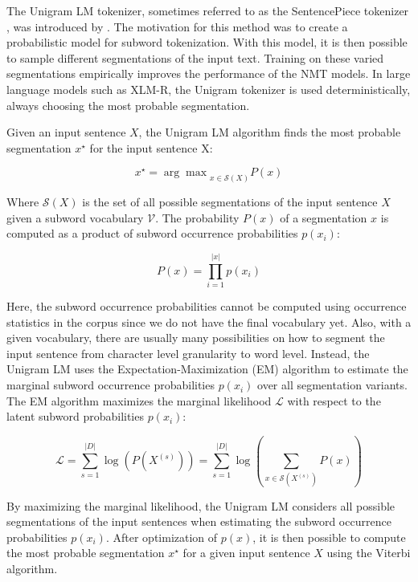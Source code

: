 The Unigram LM tokenizer, sometimes referred to as the SentencePiece tokenizer \citep{kudo_sentencepiece_2018}, was introduced by \citet{kudo_subword_2018}. The motivation for this method was to create a probabilistic model for subword tokenization. With this model, it is then possible to sample different segmentations of the input text. Training on these varied segmentations empirically improves the performance of the NMT models. In large language models such as XLM-R, the Unigram tokenizer is used deterministically, always choosing the most probable segmentation.

Given an input sentence $X$, the Unigram LM algorithm finds the most probable segmentation $x^\star$ for the input sentence X:

\begin{equation}
    x^\star = {\arg\max}_{x \in \mathcal{S}(X)} P(x)
\end{equation}


Where $\mathcal{S}(X)$ is the set of all possible segmentations of the input sentence $X$ given a subword vocabulary $\mathcal{V}$. The probability $P(x)$ of a segmentation $x$ is computed as a product of subword occurrence probabilities $p(x_i)$:

\begin{equation}
    P(x) = \prod_{i=1}^{|x|} p(x_i)
\end{equation}

Here, the subword occurrence probabilities cannot be computed using occurrence statistics in the corpus since we do not have the final vocabulary yet. Also, with a given vocabulary, there are usually many possibilities on how to segment the input sentence from character level granularity to word level. Instead, the Unigram LM uses the Expectation-Maximization (EM) algorithm to estimate the marginal subword occurrence probabilities $p(x_i)$ over all segmentation variants. The EM algorithm maximizes the marginal likelihood $\mathcal{L}$ with respect to the latent subword probabilities $p(x_i)$:

\begin{equation}
    \mathcal{L} = \sum_{s=1}^{|D|} \log (P(X^{(s)})) = \sum_{s=1}^{|D|} \log( \sum_{x \in \mathcal{S}(X^{(s)})} P(x) )
\end{equation}

By maximizing the marginal likelihood, the Unigram LM considers all possible segmentations of the input sentences when estimating the subword occurrence probabilities $p(x_i)$. After optimization of $p(x)$, it is then possible to compute the most probable segmentation $x^\star$ for a given input sentence $X$ using the Viterbi algorithm.

